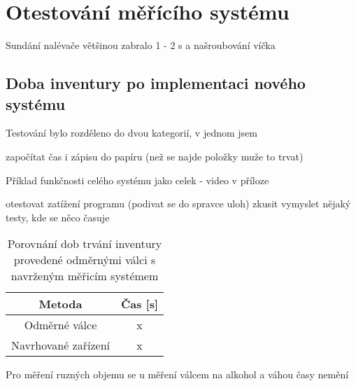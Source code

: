 
\chapter{Otestování měřícího systému}


Sundání nalévače většinou zabralo 1 - 2 s a našroubování víčka


\section{Doba inventury po implementaci nového systému}
Testování bylo rozděleno do dvou kategorií, v jednom jsem 

započítat čas i zápisu do papíru (než se najde položky muže to trvat)

Příklad funkčnosti celého systému jako celek - video v příloze

otestovat zatížení programu (podivat se do spravce uloh)
zkusit vymyslet nějaký testy, kde se něco časuje


\begin{table}[H]
    \centering
    \begin{tabular}{|c|c|}
    \hline
        Metoda & Čas [s]\\ \hline \hline
        Odměrné válce & x\\ \hline
        Navrhované zařízení & x\\ \hline
    \end{tabular}
    \caption{Porovnání dob trvání inventury provedené odměrnými válci s navrženým měřicím systémem}
    \label{tab:delka_inventury}
\end{table}

Pro měření ruzných objemu se u měření válcem na alkohol a váhou časy nemění


